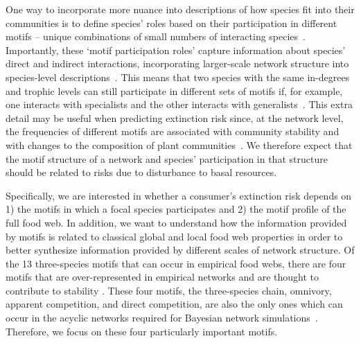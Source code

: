 \documentclass[12pt]{article}
\begin{document}
\begin{spacing}{2.0}
    One way to incorporate more nuance into descriptions of how species fit into their communities is to define species' roles based on their participation in different motifs -- unique combinations of small numbers of interacting species~\citep{Stouffer2007,Stouffer2012}. Importantly, these `motif participation roles' capture information about species' direct and indirect interactions, incorporating larger-scale network structure into species-level descriptions~\citep{Cirtwill2015JAE}. 
    This means that two species with the same in-degrees and trophic levels can still participate in different sets of motifs if, for example, one interacts with specialists and the other interacts with generalists~\citep{Cirtwill2018FoodWebs}. 
    This extra detail may be useful when predicting  extinction risk since, at the network level, the frequencies of different motifs are associated with community stability \citep{prill2005dynamic, bascompte2005simple} and with changes to the composition of plant communities~\cite{giling2019plant}. 
    We therefore expect that the motif structure of a network and species' participation in that structure should be related to risks due to disturbance to basal resources. 
    
    Specifically, we are interested in whether a consumer's extinction risk depends on 1) the motifs in which a focal species participates and 2) the motif profile of the full food web. 
    In addition, we want to understand how the information provided by motifs is related to classical global and local food web properties in order to better synthesize information provided by different scales of network structure.
    Of the 13 three-species motifs that can occur in empirical food webs, there are four motifs that are over-represented in empirical networks and are thought to contribute to stability \citep{Stouffer2007, Borrelli2015a, giling2019plant}. These four motifs, the three-species chain, omnivory, apparent competition, and direct competition, are also the only ones which can occur in the acyclic networks required for Bayesian network simulations~\citep{Eklof2013}. 
    Therefore, we focus on these four particularly important motifs.  
    


\end{spacing}
\end{document}
